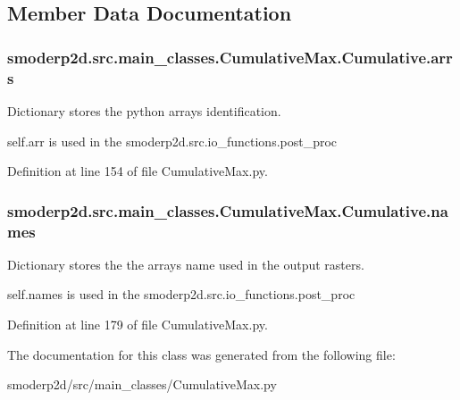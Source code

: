 \subsection{Member Data Documentation}
\hypertarget{classsmoderp2d_1_1src_1_1main__classes_1_1CumulativeMax_1_1Cumulative_a55debe509dff6cac1e187511891e8ca6}{
\subsubsection[{arrs}]{\setlength{\rightskip}{0pt plus 5cm}smoderp2d.\-src.\-main\-\_\-classes.\-Cumulative\-Max.\-Cumulative.\-arrs}}\label{classsmoderp2d_1_1src_1_1main__classes_1_1CumulativeMax_1_1Cumulative_a55debe509dff6cac1e187511891e8ca6}


Dictionary stores the python arrays identification. 

self.\-arr is used in the smoderp2d.\-src.\-io\-\_\-functions.\-post\-\_\-proc 

Definition at line 154 of file Cumulative\-Max.\-py.

\hypertarget{classsmoderp2d_1_1src_1_1main__classes_1_1CumulativeMax_1_1Cumulative_a5c371c6f6e52bbd3ac4545f7bbe87bd3}{
\subsubsection[{names}]{\setlength{\rightskip}{0pt plus 5cm}smoderp2d.\-src.\-main\-\_\-classes.\-Cumulative\-Max.\-Cumulative.\-names}}\label{classsmoderp2d_1_1src_1_1main__classes_1_1CumulativeMax_1_1Cumulative_a5c371c6f6e52bbd3ac4545f7bbe87bd3}


Dictionary stores the the arrays name used in the output rasters. 

self.\-names is used in the smoderp2d.\-src.\-io\-\_\-functions.\-post\-\_\-proc 

Definition at line 179 of file Cumulative\-Max.\-py.



The documentation for this class was generated from the following file\-:\begin{DoxyCompactItemize}
\item 
smoderp2d/src/main\-\_\-classes/Cumulative\-Max.\-py\end{DoxyCompactItemize}
